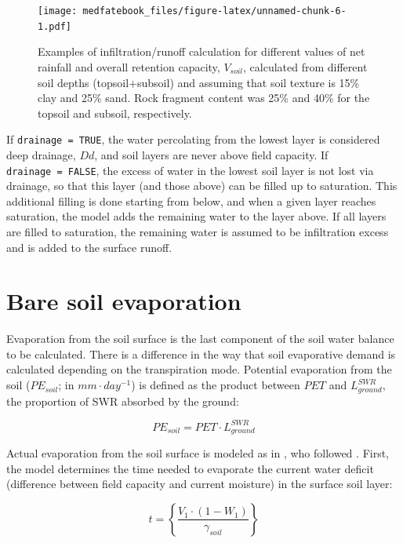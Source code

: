 \documentclass[]{book}
\begin{document}
\begin{figure}
\centering
\texttt{[image: medfatebook\_files/figure-latex/unnamed-chunk-6-1.pdf]}
\caption{\label{fig:unnamed-chunk-6}Examples of infiltration/runoff
calculation for different values of net rainfall and overall retention
capacity, \(V_{soil}\), calculated from different soil depths
(topsoil+subsoil) and assuming that soil texture is 15\% clay and 25\%
sand. Rock fragment content was 25\% and 40\% for the topsoil and
subsoil, respectively.}
\end{figure}

If \texttt{drainage\ =\ TRUE}, the water percolating from the lowest
layer is considered deep drainage, \(Dd\), and soil layers are never
above field capacity. If \texttt{drainage\ =\ FALSE}, the excess of
water in the lowest soil layer is not lost via drainage, so that this
layer (and those above) can be filled up to saturation. This additional
filling is done starting from below, and when a given layer reaches
saturation, the model adds the remaining water to the layer above. If
all layers are filled to saturation, the remaining water is assumed to
be infiltration excess and is added to the surface runoff.

\section{Bare soil evaporation}\label{soilevaporation}

Evaporation from the soil surface is the last component of the soil
water balance to be calculated. There is a difference in the way that
soil evaporative demand is calculated depending on the transpiration
mode. Potential evaporation from the soil (\(PE_{soil}\); in
\(mm\cdot day^{-1}\)) is defined as the product between \(PET\) and
\(L^{SWR}_{ground}\), the proportion of SWR absorbed by the ground:

\begin{equation}
PE_{soil} =  PET\cdot L^{SWR}_{ground}
\end{equation}

Actual evaporation from the soil surface is modeled as in
\citet{Mouillot2001}, who followed \citet{Ritchie1972}. First, the model
determines the time needed to evaporate the current water deficit
(difference between field capacity and current moisture) in the surface
soil layer:

\begin{equation}
t = \left \{ \frac{V_1\cdot(1- W_1)}{\gamma_{soil}} \right \}
\end{equation}
\end{document}
